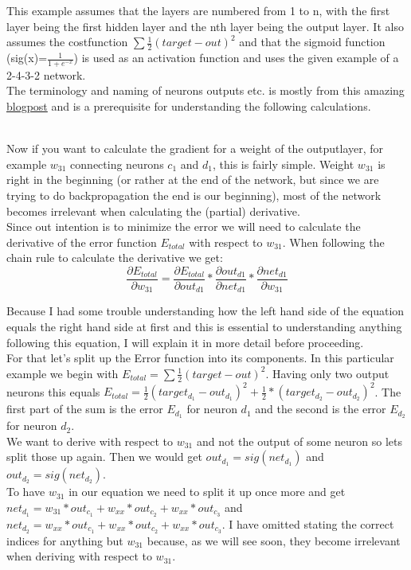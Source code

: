 \documentclass[11pt, halfparskip]{article}
\begin{document}
\noindent This example assumes that the layers are numbered from 1 to n, with the first layer being the first hidden layer and the nth layer being the output layer.
It also assumes the costfunction $\sum \frac{1}{2}(target - out)^2$ and that the sigmoid function (sig(x)=$\frac{1}{1 + e^{-x}}$) is used as an activation function and
uses the given example of a 2-4-3-2 network.\\
The terminology and naming of neurons outputs etc. is mostly from this amazing \href{https://mattmazur.com/2015/03/17/a-step-by-step-backpropagation-example}{blogpost}
and is a prerequisite for understanding the following calculations.

\noindent\\
Now if you want to calculate the gradient for a weight of the outputlayer, for example $w_{31}$ connecting neurons $c_1$ and $d_1$, this is fairly simple. Weight
$w_{31}$ is right in the beginning (or rather at the end of the network, but since we are trying to do backpropagation the end is our beginning), most of the network
becomes irrelevant when calculating the (partial) derivative.\\
Since out intention is to minimize the error we will need to calculate the derivative of the error function $E_{total}$ with respect to $w_{31}$. When following the chain rule to calculate 
the derivative we get:
    \begin{equation}
	\frac{\partial E_{total}}{\partial w_{31}} = \frac{\partial E_{total}}{\partial out_{d1}} * \frac{\partial out_{d1}}{\partial net_{d1}} * \frac{\partial net_{d1}}{\partial w_{31}}
    \end{equation}
    
\noindent Because I had some trouble understanding how the left hand side of the equation equals the right hand side at first and this is essential to understanding anything following this
equation, I will explain it in more detail before proceeding.\\
For that let's split up the Error function into its components. In this particular example we begin with $E_{total} = \sum \frac{1}{2}(target-out)^2$. Having only two output neurons
this equals $E_{total} = \frac{1}{2}(target_{d_1} - out_{d_1})^2 + \frac{1}{2}*(target_{d_2} - out_{d_2})^2$.
The first part of the sum is the error $E_{d_1}$ for neuron $d_1$ and the second is the error $E_{d_2}$ for neuron $d_2$.\\
We want to derive with respect to $w_{31}$ and not the output of some neuron so lets split those up again. Then we would get $out_{d_1} = sig(net_{d_1})$ and 
$out_{d_2} = sig(net_{d_2})$.\\
To have $w_{31}$ in our equation we need to split it up once more and get $net_{d_1} = w_{31}*out_{c_1} + w_{xx}*out_{c_2} + w_{xx}*out_{c_3}$ and
$net_{d_2} = w_{xx}*out_{c_1} + w_{xx}*out_{c_2} + w_{xx}*out_{c_3}$. I have omitted stating the correct indices for anything but $w_{31}$ because, as we will see soon,
they become irrelevant when deriving with respect to $w_{31}$.\\
\end{document}
